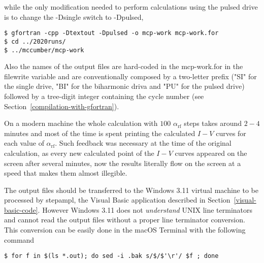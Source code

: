 while the only modification needed to perform calculations using the pulsed drive is to change the \textsf{-Dsingle} switch to \textsf{-Dpulsed}, 

\begin{lstlisting}
$ gfortran -cpp -Dtextout -Dpulsed -o mcp-work mcp-work.for
$ cd ../2020runs/
$ ../mccumber/mcp-work
\end{lstlisting}

Also the names of the output files are hard-coded in the \textsf{mcp-work.for} in the \textsf{filewrite} variable and are conventionally composed by a two-letter prefix ("SI" for the single drive, "BI" for the biharmonic driva and "PU" for the pulsed drive) followed by a tree-digit integer containing the cycle number (see Section~\ref{compilation-with-gfortran}).

On a modern machine the whole calculation with $100$ $\alpha_\mathrm{rf}$ steps takes around $2 - 4$ minutes and most of the time is spent printing the calculated $I - V$ curves for each value of $\alpha_\mathrm{rf}$. Such feedback was necessary at the time of the original calculation, as every new calculated point of the $I - V$ curves appeared on the screen after several minutes, now the results literally flow on the screen at a speed that makes them almost illegible.

The output files should be transferred to the Windows 3.11 virtual machine to be processed by \textsf{stepampl}, the Visual Basic application described in Section~\ref{visual-basic-code}. However Windows 3.11 does not \emph{understand} UNIX line terminators and cannot read the output files without a proper line terminator conversion. This conversion can be easily done in the macOS Terminal with the following command

\begin{lstlisting}
$ for f in $(ls *.out); do sed -i .bak s/$/$'\r'/ $f ; done
\end{lstlisting}

